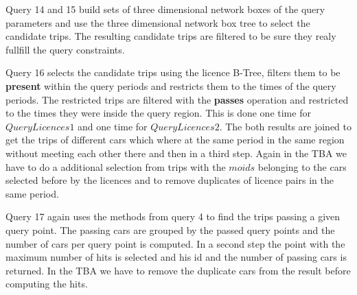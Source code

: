 \documentclass[a4paper]{article}
\newcommand{\op}[1]{\textbf{#1}}
\begin{document}
Query 14 and 15 build sets of three dimensional network boxes of the query parameters
and use the three dimensional network box tree to select the candidate trips. The
resulting candidate trips are filtered to be sure they realy fullfill the query
constraints.

Query 16 selects the candidate trips using the licence B-Tree, filters them to be \op{present} within the query periods and restricts them to the times of the query periods. The restricted trips are filtered with the \op{passes} operation and restricted
to the times they were inside the query region. This is done one time
for $QueryLicences1$ and one time for $QueryLicences2$. The both results are joined
to get the trips of different cars which where at the same period in the same region
without meeting each other there and then in a third step. Again in the TBA we have
to do a additional selection from trips with the $moids$ belonging to the cars
selected before by the licences and to remove duplicates of licence pairs in the
same period.

Query 17 again uses the methods from query 4 to find the trips passing a given query
point. The passing cars are grouped by the passed query points and the number of
cars per query point is computed. In a second step the point with the maximum number
of hits is selected and his id and the number of passing cars is returned. In the
TBA we have to remove the duplicate cars from the result before computing the hits.
\end{document}
